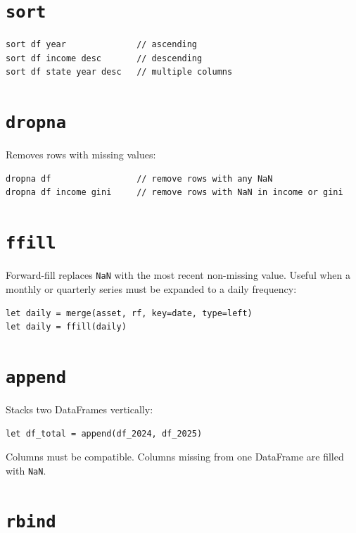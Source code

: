 \section{\texttt{sort}}

\begin{lstlisting}
sort df year              // ascending
sort df income desc       // descending
sort df state year desc   // multiple columns
\end{lstlisting}

\section{\texttt{dropna}}

Removes rows with missing values:

\begin{lstlisting}
dropna df                 // remove rows with any NaN
dropna df income gini     // remove rows with NaN in income or gini
\end{lstlisting}

\section{\texttt{ffill}}

Forward-fill replaces \texttt{NaN} with the most recent non-missing value.
Useful when a monthly or quarterly series must be expanded to a daily
frequency:

\begin{lstlisting}[caption={Forward-filling a monthly rate into daily data}]
let daily = merge(asset, rf, key=date, type=left)
let daily = ffill(daily)
\end{lstlisting}

\section{\texttt{append}}

Stacks two DataFrames vertically:

\begin{lstlisting}
let df_total = append(df_2024, df_2025)
\end{lstlisting}

Columns must be compatible. Columns missing from one DataFrame are filled
with \texttt{NaN}.

\section{\texttt{rbind}}

